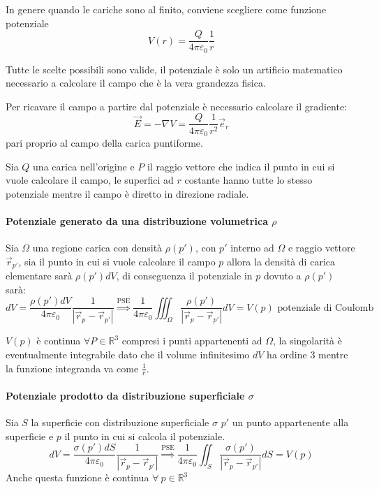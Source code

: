 In genere quando le cariche sono al finito, conviene scegliere come funzione potenziale
$$
V(r) = \frac{Q}{4 \pi \varepsilon_0}\frac{1}{r}
$$

Tutte le scelte possibili sono valide, il potenziale è solo un artificio matematico
necessario a calcolare il campo che è la vera grandezza fisica.

Per ricavare il campo a partire dal potenziale è necessario calcolare il gradiente:
$$
\vec{E} = -\nabla V = \frac{Q}{4\pi\varepsilon_0}\frac{1}{r^2}\vec{e}_r
$$
pari proprio al campo della carica puntiforme.

Sia $Q$ una carica nell'origine e $P$ il raggio vettore che indica il punto in cui si vuole
calcolare il campo, le superfici ad $r$ costante hanno tutte lo stesso potenziale mentre
il campo è diretto in direzione radiale.

\paragraph{Potenziale generato da una distribuzione volumetrica $\rho$}
Sia $\Omega$ una regione carica con densità $\rho(p')$, con $p'$ interno ad $\Omega$ e raggio
vettore $\vec{r}_{p'}$, sia il punto in cui si vuole calcolare il campo $p$
allora la densità di carica elementare sarà $\rho(p')dV$, di conseguenza il potenziale in $p$
dovuto a $\rho(p')$ sarà:
$$
dV = \frac{\rho(p')dV}{4\pi\varepsilon_0}\frac{1}{|\vec{r}_p - \vec{r}_{p'}|} 
\stackrel{\text{PSE}}{\Rightarrow} \frac{1}{4\pi\varepsilon_0} \iiint_\Omega \frac{\rho(p')}{|\vec{r}_p - \vec{r}_{p'}|} dV = V(p) \text{ potenziale di Coulomb}
$$

$V(p)$ è continua $\forall P \in \mathbb{R}^3$ compresi i punti appartenenti ad $\Omega$, la 
singolarità è eventualmente integrabile dato che il volume infinitesimo $dV$ ha ordine 3 mentre la 
funzione integranda va come $\frac{1}{r}$.

\paragraph{Potenziale prodotto da distribuzione superficiale $\sigma$}
Sia $S$ la superficie con distribuzione superficiale $\sigma$ $p'$ un punto appartenente alla 
superficie e $p$ il punto in cui si calcola il potenziale.
$$
dV = \frac{\sigma(p')dS}{4\pi\varepsilon_0} \frac{1}{|\vec{r}_p - \vec{r}_{p'}|} 
\stackrel{\text{PSE}}{\Rightarrow}
\frac{1}{4\pi\varepsilon_0} \iint_S \frac{\sigma(p')}{|\vec{r}_p - \vec{r}_{p'}|} dS = V(p)
$$
Anche questa funzione è continua $\forall\ p \in \mathbb{R}^3$

